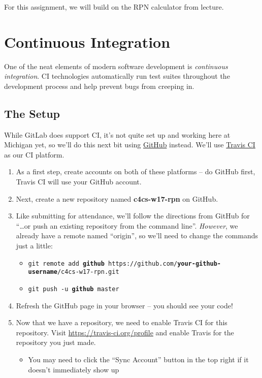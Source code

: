 \documentclass{article}
\begin{document}


\bigskip

\begin{mdframed}\centering
For this assignment, we will build on the RPN calculator from lecture.
\end{mdframed}



\section{Continuous Integration}
One of the neat elements of modern software development is \emph{continuous
  integration}. CI technologies automatically run test suites throughout the
development process and help prevent bugs from creeping in.

\subsection{The Setup}

While GitLab does support CI, it's not quite set up and working here at
Michigan yet, so we'll do this next bit using
\href{https://github.com}{GitHub} instead.
We'll use \href{https://travis-ci.org/}{Travis CI} as our CI platform.

\begin{enumerate}
  \item As a first step, create accounts on both of these platforms -- do
    GitHub first, Travis CI will use your GitHub account.
  \item Next, create a new repository named \textbf{c4cs-w17-rpn} on GitHub.
  \item Like submitting for attendance, we'll follow the directions from
    GitHub for ``\dots{}or push an existing repository from the command
    line''. \emph{However}, we already have a remote named ``origin'', so
    we'll need to change the commands just a little:
    \begin{itemize}
      \item \texttt{git remote add \textbf{github} https://github.com/\textbf{your-github-username}/c4cs-w17-rpn.git}
      \item \texttt{git push -u \textbf{github} master}
    \end{itemize}
  \item Refresh the GitHub page in your browser -- you should see your code!
  \item Now that we have a repository, we need to enable Travis CI for this
    repository. Visit \url{https://travis-ci.org/profile} and enable Travis
    for the repository you just made.
    \begin{itemize}
      \item You may need to click the ``Sync Account'' button in the top
        right if it doesn't immediately show up
    \end{itemize}
\end{enumerate}
\end{document}
